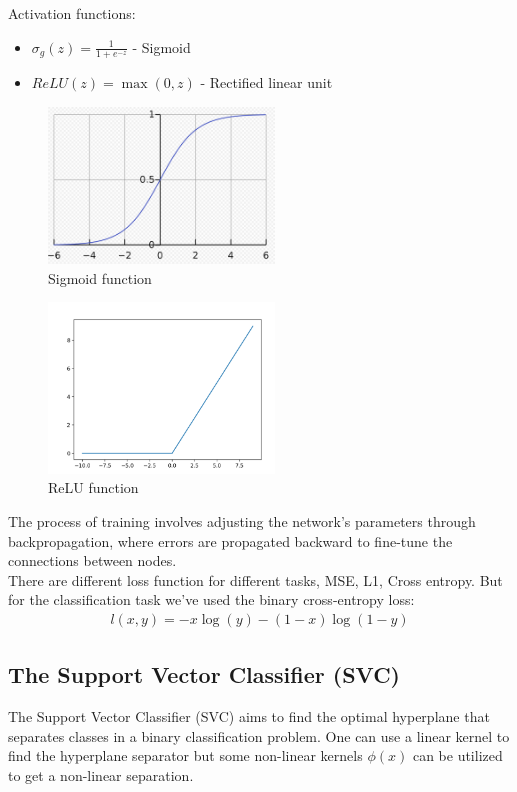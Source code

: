 \documentclass[12pt]{report}
\begin{document}
Activation functions:
\begin{itemize}
	\item $\sigma_g(z) = \frac{1}{1+e^{-z}}$ - Sigmoid 
	\item $ReLU(z) = \max(0, z)$  - Rectified linear unit
\end{itemize}	
\begin{figure}[H]\centering\includegraphics[width=6cm]{sigmoid.png}\caption{Sigmoid function}\end{figure}
\begin{figure}[H]\centering\includegraphics[width=6cm]{RELU.png}\caption{ReLU function}\end{figure}



The process of training involves adjusting the network's parameters through backpropagation, where errors are propagated backward to fine-tune the connections between nodes.\\

There are different loss function for different tasks, MSE, L1, Cross entropy. But for the classification task we've used the binary cross-entropy loss:
\begin{align*}
	l(x,y) = 	-x\log(y)-(1-x)\log(1-y)
\end{align*}
 


\subsection{The Support Vector Classifier (SVC)}

The Support Vector Classifier (SVC) aims to find the optimal hyperplane that separates classes in a binary classification problem. One can use a linear kernel to find the hyperplane separator but some non-linear kernels $\phi(x)$ can be utilized to get a non-linear separation.\\   
\end{document}
